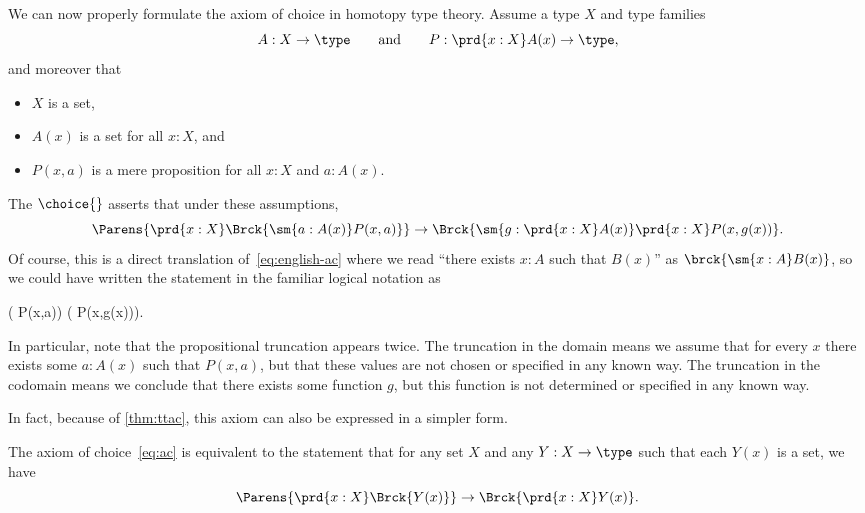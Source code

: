%
%
We can now properly formulate the axiom of choice in homotopy type theory.
Assume a type $X$ and type families
%
\begin{equation*}
  A:X\to\type
  \qquad\text{and}\qquad
  P:\prd{x:X} A(x)\to\type,
\end{equation*}
%
and moreover that
\begin{itemize}
\item $X$ is a set,
\item $A(x)$ is a set for all $x:X$, and
\item $P(x,a)$ is a mere proposition for all $x:X$ and $a:A(x)$.
\end{itemize}
The 
$\choice{}$ asserts that under these assumptions,
\begin{equation}\label{eq:ac}
  \Parens{\prd{x:X} \Brck{\sm{a:A(x)} P(x,a)}}
  \to
  \Brck{\sm{g:\prd{x:X} A(x)} \prd{x:X} P(x,g(x))}.
\end{equation}
Of course, this is a direct translation of~\eqref{eq:english-ac} where we read ``there exists $x:A$ such that $B(x)$'' as $\brck{\sm{x:A}B(x)}$, so we could have written the statement in the familiar logical notation as
\begin{narrowmultline*}
  \textstyle
  \Big( P(x,a)\Big)
  \Rightarrow \narrowbreak
  \Big(  P(x,g(x))\Big).
\end{narrowmultline*}
%
In particular, note that the propositional truncation appears twice.
The truncation in the domain means we assume that for every $x$ there exists some $a:A(x)$ such that $P(x,a)$, but that these values are not chosen or specified in any known way.
The truncation in the codomain means we conclude that there exists some function $g$, but this function is not determined or specified in any known way.

In fact, because of \cref{thm:ttac}, this axiom can also be expressed in a simpler form.

\begin{lem}\label{thm:ac-epis-split}
  The axiom of choice~\eqref{eq:ac} is equivalent to the statement that for any set $X$ and any $Y:X\to\type$ such that each $Y(x)$ is a set, we have
  \begin{equation}
    \Parens{\prd{x:X} \Brck{Y(x)}}
    \to
    \Brck{\prd{x:X} Y(x)}.\label{eq:epis-split}
  \end{equation}
\end{lem}

